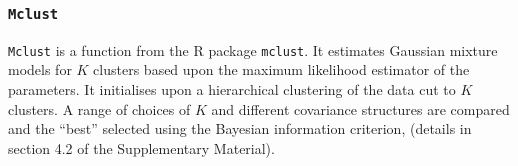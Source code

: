 \documentclass{bmcart}
\begin{document}

\subsubsection*{\texttt{Mclust}}
\texttt{Mclust} \citep{mclust2016scrucca} is a function from the R package \texttt{mclust}. It estimates Gaussian mixture models for $K$ clusters based upon the maximum likelihood estimator of the parameters. It initialises upon a hierarchical clustering of the data cut to $K$ clusters. A range of choices of $K$ and different covariance structures are compared and the ``best'' selected using the Bayesian information criterion, \citep[][]{schwarz1978estimating} (details in section 4.2 of the Supplementary Material).
\end{document}

